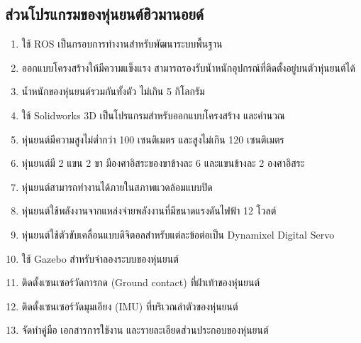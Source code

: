 \subsection{ส่วนโปรแกรมของหุ่นยนต์ฮิวมานอยด์}
\begin{enumerate}[label=\arabic*, leftmargin=1.5cm]
	\item ใช้ ROS เป็นกรอบการทำงานสำหรับพัฒนาระบบพื้นฐาน
	\item ออกแบบโครงสร้างให้มีความแข็งแรง สามารถรองรับน้ำหนักอุปกรณ์ที่ติดตั้งอยู่บนตัวหุ่นยนต์ได้
	\item น้ำหนักของหุ่นยนต์รวมกันทั้งตัว ไม่เกิน 5 กิโลกรัม
	\item ใช้ Solidworks 3D เป็นโปรแกรมสำหรับออกแบบโครงสร้าง และคำนวณ
	\item หุ่นยนต์มีความสูงไม่ต่ำกว่า 100 เซนติเมตร และสูงไม่เกิน 120 เซนติเมตร
	\item หุ่นยนต์มี 2 แขน 2 ขา มีองศาอิสระของขาข้างละ 6 และแขนข้างละ 2 องศาอิสระ
	\item หุ่นยนต์สามารถทำงานได้ภายในสภาพแวดล้อมแบบปิด
	\item หุ่นยนต์ใช้พลังงานจากแหล่งจ่ายพลังงานที่มีขนาดแรงดันไฟฟ้า 12 โวลต์
	\item หุ่นยนต์ใช้ตัวขับเคลื่อนแบบดิจิตอลสำหรับแต่ละข้อต่อเป็น Dynamixel Digital Servo
	\item ใช้ Gazebo สำหรับจำลองระบบของหุ่นยนต์
	\item ติดตั้งเซนเซอร์วัดการกด (Ground contact) ที่ฝ่าเท้าของหุ่นยนต์
	\item ติดตั้งเซนเซอร์วัดมุมเอียง (IMU) ที่บริเวณลำตัวของหุ่นยนต์
	\item จัดทำคู่มือ เอกสารการใช้งาน และรายละเอียดส่วนประกอบของหุ่นยนต์
\end{enumerate}

